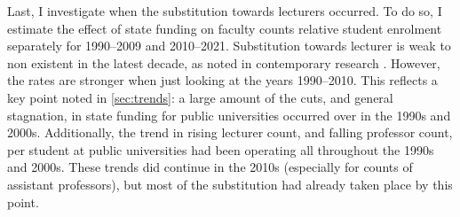 Last, I investigate when the substitution towards lecturers occurred.
To do so, I estimate the effect of state funding on faculty counts relative student enrolment separately for 1990--2009 and 2010--2021.
Substitution towards lecturer is weak to non existent in the latest decade, as noted in contemporary research \citep{hinrichs2022state}.
However, the rates are stronger when just looking at the years 1990--2010.
This reflects a key point noted in \autoref{sec:trends}: a large amount of the cuts, and general stagnation, in state funding for public universities occurred over in the 1990s and 2000s.
Additionally, the trend in rising lecturer count, and falling professor count, per student at public universities had been operating all throughout the 1990s and 2000s.
These trends did continue in the 2010s (especially for counts of assistant professors), but most of the substitution had already taken place by this point.
